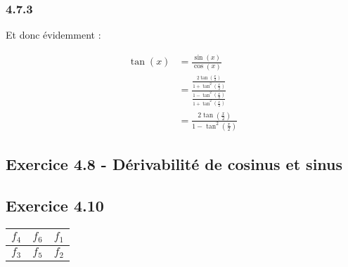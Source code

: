 \documentclass[a4paper,10pt]{report}
\begin{document}
\subsubsection*{4.7.3}

Et donc évidemment :

\begin{equation*}
	\begin{split}
		\tan (x) 
		&= \frac{\sin(x)}{\cos(x)} \\
		&= \frac{\frac{2 \tan(\frac{x}{2})}{1 + \tan^2(\frac{x}{2})}}{\frac{1 - \tan^2(\frac{x}{2})}{1 + \tan^2(\frac{x}{2})}} \\
		&= \frac{2 \tan(\frac{x}{2})}{1 - \tan^2(\frac{x}{2})}
	\end{split}
\end{equation*}

\subsection*{Exercice 4.8 - Dérivabilité de cosinus et sinus}

\subsection*{Exercice 4.10}

\begin{tabular}{|c|c|c|}
	\hline
	$f_4$ & $f_6$ & $f_1$ \\
	\hline
	$f_3$ & $f_5$ & $f_2$  \\
	\hline
\end{tabular}
\end{document}
